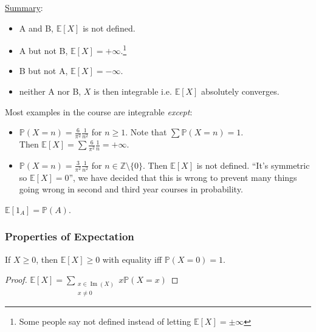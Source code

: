 \underline{Summary}: 
\begin{itemize}
    \item A and B, $\mathbb{E}[X]$ is not defined.
    \item A but not B, $\mathbb{E}[X] = + \infty$.\footnote{Some people say not defined instead of letting $\mathbb{E}[X] =  \pm \infty$}
    \item B but not A, $\mathbb{E}[X] = - \infty$.
    \item neither A nor B, $X$ is then integrable i.e. $\mathbb{E}[X]$ absolutely converges.
\end{itemize} 

\begin{example}
    Most examples in the course are integrable \emph{except}: 
    \begin{itemize}
        \item $\mathbb{P}(X = n) = \frac{6}{\pi^2} \frac{1}{n^2}$ for $n \geq 1$.
        Note that $\sum \mathbb{P}(X = n) = 1$. \\
        Then $\mathbb{E}[X] = \sum \frac{6}{\pi^2} \frac{1}{n} = + \infty$.
        \item $\mathbb{P}(X = n) = \frac{3}{\pi^2} \frac{1}{n^2}$ for $n \in \mathbb{Z} \setminus \{0\}$.
        Then $\mathbb{E}[X]$ is not defined.
        \color{blue} ``It's symmetric so $\mathbb{E}[X] = 0$'', we have decided that this is wrong to prevent many things going wrong in second and third year courses in probability.
    \end{itemize} 
\end{example} 

\begin{example} \label{exm:exp-indi}
    $\mathbb{E}[1_A] = \mathbb{P}(A)$.
\end{example} 

\subsubsection{Properties of Expectation}

\begin{proposition} \label{prp:exp-1}
    If $X \geq 0$, then $\mathbb{E}[X] \geq 0$ with equality iff $\mathbb{P}(X = 0) = 1$. 
\end{proposition} 

\begin{proof}
    $\displaystyle \mathbb{E}[X] = \sum_{\substack{x \in \operatorname{Im}(X) \\ x \neq 0}} x \mathbb{P}(X = x)$
\end{proof} 

